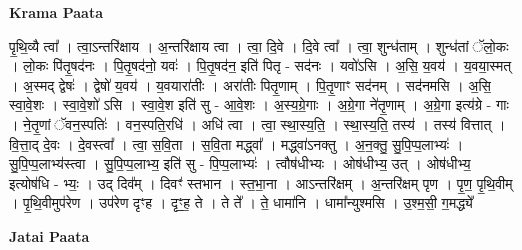 \documentclass[17pt]{extarticle}
\begin{document}
\textbf{Krama Paata} \newline

पृ॒थि॒व्यै त्वा᳚ । त्वा॒ऽन्तरि॑क्षाय । अ॒न्तरि॑क्षाय त्वा । त्वा॒ दि॒वे । दि॒वे त्वा᳚ । त्वा॒ शुन्ध॑ताम् । शुन्ध॑तां ॅलो॒कः । लो॒कः पि॑तृ॒षद॑नः । पि॒तृ॒षद॑नो॒ यवः॑ । पि॒तृ॒षद॑न॒ इति॑ पितृ - सद॑नः । यवो॑ऽसि । अ॒सि॒ य॒वय॑ । य॒वया॒स्मत् । अ॒स्मद् द्वेषः॑ । द्वेषो॑ य॒वय॑ । य॒वयारा॑तीः । अरा॑तीः पितृ॒णाम् । पि॒तृ॒णाꣳ सद॑नम् । सद॑नमसि । अ॒सि॒ स्वा॒वे॒शः । स्वा॒वे॒शो॑ ऽसि । स्वा॒वे॒श इति॑ सु - आ॒वे॒शः । अ॒स्य॒ग्रे॒गाः । अ॒ग्रे॒गा ने॑तृ॒णाम् । अ॒ग्रे॒गा इत्य॑ग्रे - गाः । ने॒तृ॒णां ॅवन॒स्पतिः॑ । वन॒स्पति॒रधि॑ । अधि॑ त्वा । त्वा॒ स्था॒स्य॒ति॒ । स्था॒स्य॒ति॒ तस्य॑ । तस्य॑ वित्तात् । वि॒त्ता॒द् दे॒वः । दे॒वस्त्वा᳚ । त्वा॒ स॒वि॒ता । स॒वि॒ता मद्ध्वा᳚ । मद्ध्वा॑ऽनक्तु । अ॒न॒क्तु॒ सु॒पि॒प्प॒लाभ्यः॑ । सु॒पि॒प्प॒लाभ्य॑स्त्वा । सु॒पि॒प्प॒लाभ्य॒ इति॑ सु - पि॒प्प॒लाभ्यः॑ । त्वौष॑धीभ्यः । ओष॑धीभ्य॒ उत् । ओष॑धीभ्य॒ इत्योष॑धि - भ्यः॒ । उद् दिव᳚म् । दिवꣳ॑ स्तभान । स्त॒भा॒ना । आऽन्तरि॑क्षम् । अ॒न्तरि॑क्षम् पृण । पृ॒ण॒ पृ॒थि॒वीम् । पृ॒थि॒वीमुप॑रेण । उप॑रेण दृꣳह । दृꣳ॒॒ह॒ ते । ते ते᳚ । ते॒ धामा॑नि । धामा᳚न्युश्मसि । उ॒श्म॒सी॒ ग॒मद्ध्ये᳚ \newline

\textbf{Jatai Paata} \newline
\end{document}
